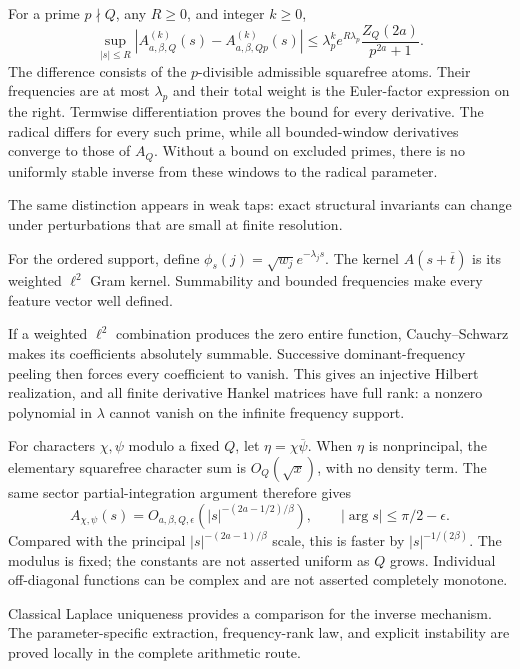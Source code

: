 For a prime $p\nmid Q$, any $R\ge0$, and integer $k\ge0$,
\[
\boxed{\sup_{|s|\le R}|A_{a,\beta,Q}^{(k)}(s)-A_{a,\beta,Qp}^{(k)}(s)|
\le\lambda_p^k e^{R\lambda_p}\frac{Z_Q(2a)}{p^{2a}+1}.}
\]
The difference consists of the $p$-divisible admissible squarefree atoms.
Their frequencies are at most $\lambda_p$ and their total weight is the
Euler-factor expression on the right. Termwise differentiation proves the
bound for every derivative.
The radical differs for every such prime, while all bounded-window derivatives
converge to those of $A_Q$. Without a bound on excluded primes, there is no
uniformly stable inverse from these windows to the radical parameter.

The same distinction appears in weak taps: exact structural invariants can
change under perturbations that are small at finite resolution.

For the ordered support, define $\phi_s(j)=\sqrt{w_j}e^{-\lambda_js}$.
The kernel $A(s+\overline t)$ is its weighted $\ell^2$ Gram kernel.
Summability and bounded frequencies make every feature vector well defined.

If a weighted $\ell^2$ combination produces the zero entire function,
Cauchy--Schwarz makes its coefficients absolutely summable. Successive
dominant-frequency peeling then forces every coefficient to vanish. This
gives an injective Hilbert realization, and all finite derivative Hankel
matrices have full rank: a nonzero polynomial in $\lambda$ cannot vanish
on the infinite frequency support.

For characters $\chi,\psi$ modulo a fixed $Q$, let
$\eta=\chi\overline\psi$. When $\eta$ is nonprincipal, the elementary
squarefree character sum is $O_Q(\sqrt x)$, with no density term.
The same sector partial-integration argument therefore gives
\[
A_{\chi,\psi}(s)
=O_{a,\beta,Q,\epsilon}(|s|^{-(2a-1/2)/\beta}),
\qquad |\arg s|\le\pi/2-\epsilon.
\]
Compared with the principal $|s|^{-(2a-1)/\beta}$ scale, this is faster
by $|s|^{-1/(2\beta)}$. The modulus is fixed; the constants are not asserted uniform as $Q$ grows. Individual off-diagonal functions can be complex and are not asserted
completely monotone.

Classical Laplace uniqueness provides a comparison for the inverse mechanism.
The parameter-specific extraction, frequency-rank law, and explicit instability
are proved locally in the complete arithmetic route.
